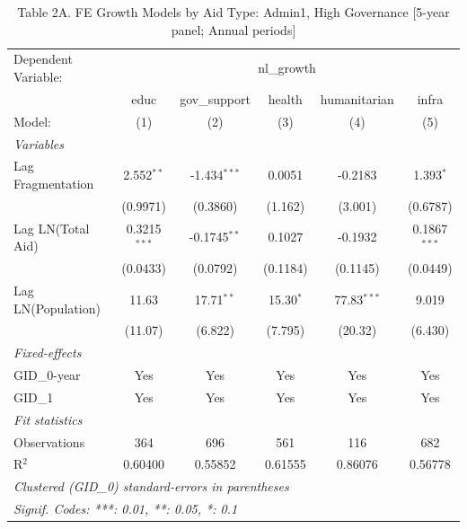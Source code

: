 
\begin{table}[H]
   \caption{Table 2A. FE Growth Models by Aid Type: Admin1, High Governance [5-year panel; Annual periods]}
   \centering
   \begin{tabular}{lccccc}
      \tabularnewline \midrule \midrule
      Dependent Variable: & \multicolumn{5}{c}{nl\_growth}\\
                         & educ           & gov\_support   & health      & humanitarian  & infra \\   
      Model:             & (1)            & (2)            & (3)         & (4)           & (5)\\  
      \midrule
      \emph{Variables}\\
      Lag Fragmentation  & 2.552$^{**}$   & -1.434$^{***}$ & 0.0051      & -0.2183       & 1.393$^{*}$\\   
                         & (0.9971)       & (0.3860)       & (1.162)     & (3.001)       & (0.6787)\\   
      Lag LN(Total Aid)  & 0.3215$^{***}$ & -0.1745$^{**}$ & 0.1027      & -0.1932       & 0.1867$^{***}$\\   
                         & (0.0433)       & (0.0792)       & (0.1184)    & (0.1145)      & (0.0449)\\   
      Lag LN(Population) & 11.63          & 17.71$^{**}$   & 15.30$^{*}$ & 77.83$^{***}$ & 9.019\\   
                         & (11.07)        & (6.822)        & (7.795)     & (20.32)       & (6.430)\\   
      \midrule
      \emph{Fixed-effects}\\
      GID\_0-year        & Yes            & Yes            & Yes         & Yes           & Yes\\  
      GID\_1             & Yes            & Yes            & Yes         & Yes           & Yes\\  
      \midrule
      \emph{Fit statistics}\\
      Observations       & 364            & 696            & 561         & 116           & 682\\  
      R$^2$              & 0.60400        & 0.55852        & 0.61555     & 0.86076       & 0.56778\\  
      \midrule \midrule
      \multicolumn{6}{l}{\emph{Clustered (GID\_0) standard-errors in parentheses}}\\
      \multicolumn{6}{l}{\emph{Signif. Codes: ***: 0.01, **: 0.05, *: 0.1}}\\
   \end{tabular}
\end{table}


